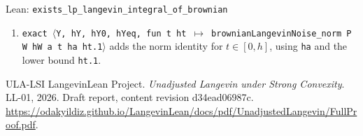 \documentclass[11pt,a4paper]{article}
\begin{document}
\begin{leanbox}{Lean: \texttt{exists\_\allowbreak{}lp\_\allowbreak{}langevin\_\allowbreak{}integral\_\allowbreak{}of\_\allowbreak{}brownian}}
\begin{enumerate}
\item \texttt{exact \ensuremath{\langle}Y, h\allowbreak{}Y, h\allowbreak{}Y0, h\allowbreak{}Yeq, fun t ht \ensuremath{\mapsto} brownian\allowbreak{}Langevin\allowbreak{}Noise\_\allowbreak{}norm P W h\allowbreak{}W a t ha ht.\allowbreak{}1\ensuremath{\rangle}} adds the norm identity for \(t\in[0,h]\), using \texttt{ha} and the lower bound \texttt{ht.\allowbreak{}1}.

\end{enumerate}
\end{leanbox}

\begin{thebibliography}{ULA-LSI}
LangevinLean Project. \emph{Unadjusted Langevin under Strong Convexity}. LL-01, 2026. Draft report, content revision d34ead06987c. \url{https://odakyildiz.github.io/LangevinLean/docs/pdf/UnadjustedLangevin/FullProof.pdf}.
\end{thebibliography}
\end{document}
